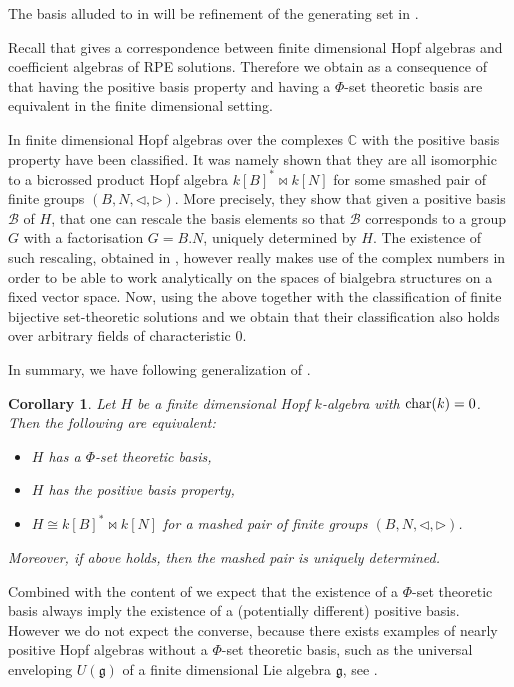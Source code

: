 \documentclass[a4paper,10pt]{amsart}
\newtheorem{corollary}[lemma]{Corollary}
\theoremstyle{definition}
\theoremstyle{remark}
\newcommand\triangler{\triangleright}
\newcommand\trianglel{\triangleleft}
\newcommand\Char{{\rm char}}
\newcommand\mc{\mathcal}
\newcommand{\C}{{\mathbb C}}
\begin{document}
The basis alluded to in  will be refinement of the generating set in . 

Recall that   gives a correspondence between finite dimensional Hopf algebras and coefficient algebras of RPE solutions. Therefore we obtain as a consequence of  that having the positive basis property and having a $\Phi$-set theoretic basis are equivalent in the finite dimensional setting. 


In \cite{zbMATH01616308} finite dimensional Hopf algebras over the complexes $\C$ with the positive basis property have been classified. It was namely shown that they are all isomorphic to a bicrossed product Hopf algebra $k[B]^* \bowtie k[N]$ for some smashed pair of finite groups $(B,N, \trianglel,\triangler)$. More precisely, they show that given a positive basis $\mc{B}$ of $H$, that one can rescale the basis elements so that $\mc{B}$ corresponds to a group $G$ with a factorisation $G = B.N$, uniquely determined by $H$. The existence of such rescaling, obtained in \cite[Section 4]{zbMATH01616308}, however really makes use of the complex numbers in order to be able to work analytically on the spaces of bialgebra structures on a fixed vector space. Now, using the above together with the classification of finite bijective set-theoretic solutions \cite{COvA} and  we obtain that their classification also holds over arbitrary fields of characteristic $0$. 

In summary, we have following generalization of \cite[Theorem 1]{zbMATH01616308}.

\begin{corollary}\label{coro set basis iff positive}
    Let $H$ be a finite dimensional Hopf $k$-algebra with $\Char(k)=0$. Then the following are equivalent:
    \begin{itemize}
    \item $H$ has a $\Phi$-set theoretic basis,
    \item $H$ has the positive basis property,
    \item $H \cong k[B]^* \bowtie k[N]$ for a mashed pair of finite groups $(B,N, \trianglel,\triangler)$.
    \end{itemize}
    Moreover, if above holds, then the mashed pair is uniquely determined.
\end{corollary}

Combined with the content of  we expect that the existence of a $\Phi$-set theoretic basis always imply the existence of a (potentially different) positive basis. However we do not expect the converse, because there exists examples of nearly positive Hopf algebras without a $\Phi$-set theoretic basis, such as the universal enveloping $U(\mathfrak{g})$ of a finite dimensional Lie algebra $\mathfrak{g}$, see . 
\end{document}
